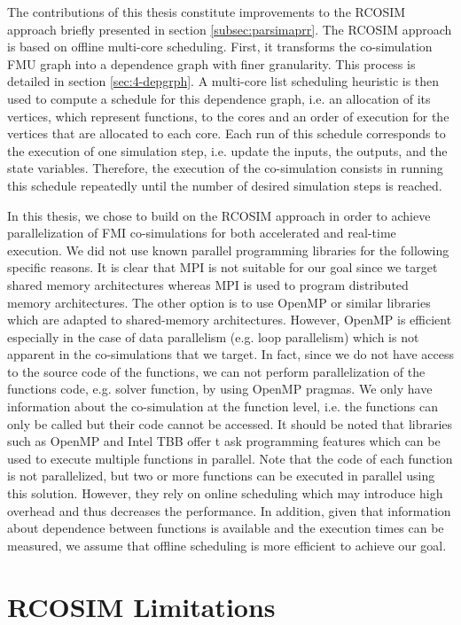 The contributions of this thesis constitute improvements to the RCOSIM approach briefly presented in section \ref{subsec:parsimaprr}. The RCOSIM approach is based on offline multi-core scheduling. First, it transforms the co-simulation FMU graph into a dependence graph with finer granularity. This process is detailed in section \ref{sec:4-depgrph}. A multi-core list scheduling heuristic is then used to compute a schedule for this dependence graph, i.e. an allocation of its vertices, which represent functions, to the cores and an order of execution for the vertices that are allocated to each core. Each run of this schedule corresponds to the execution of one simulation step, i.e. update the inputs, the outputs, and the state variables. Therefore, the execution of the co-simulation consists in running this schedule repeatedly until the number of desired simulation steps is reached.

In this thesis, we chose to build on the RCOSIM approach in order to achieve parallelization of FMI co-simulations for both accelerated and real-time execution. We did not use known parallel programming libraries for the following specific reasons. It is clear that MPI is not suitable for our goal since we target shared memory architectures whereas MPI is used to program distributed memory architectures. The other option is to use OpenMP or similar libraries which are adapted to shared-memory architectures. However, OpenMP is efficient especially in the case of data parallelism (e.g. loop parallelism) which is not apparent in the co-simulations that we target. In fact, since we do not have access to the source code of the functions, we can not perform parallelization of the functions code, e.g. solver function, by using OpenMP pragmas. We only have information about the co-simulation at the function level, i.e. the functions can only be called but their code cannot be accessed. It should be noted that libraries such as OpenMP and Intel TBB offer t   ask programming features which can be used to execute multiple functions in parallel. Note that the code of each function is not parallelized, but two or more functions can be executed in parallel using this solution. However, they rely on online scheduling which may introduce high overhead and thus decreases the performance. In addition, given that information about dependence between functions is available and the execution times can be measured, we assume that offline scheduling is more efficient to achieve our goal.   

\section{RCOSIM Limitations}

